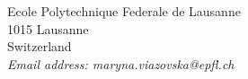 \newpage

{\footnotesize
\noindent
Ecole Polytechnique Federale de Lausanne\\
1015 Lausanne\\
Switzerland\\
{\it Email address: maryna.viazovska@epfl.ch}}
